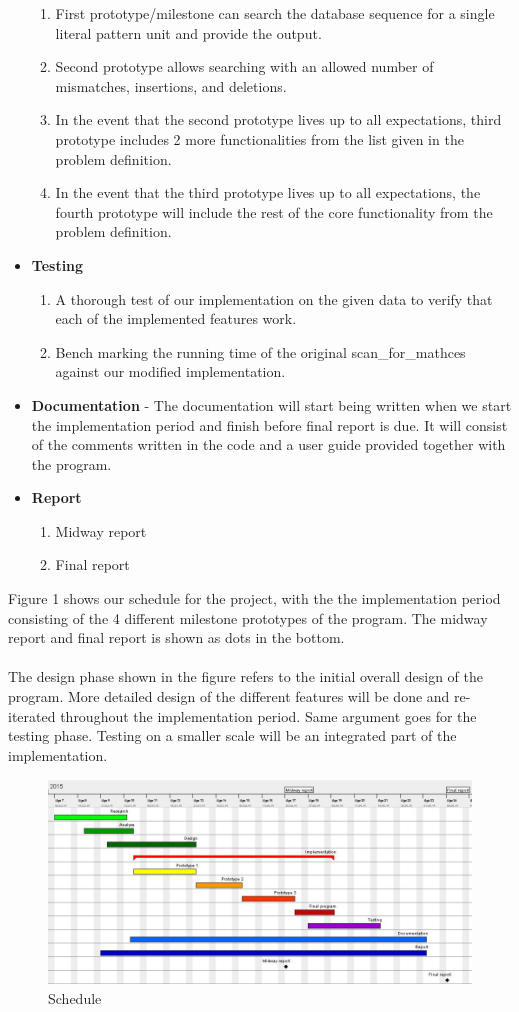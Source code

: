 \documentclass[12pt]{article}
\begin{document}
\begin{itemize}
\begin{enumerate}
\item First prototype/milestone can search the database sequence for a single literal pattern unit and provide the output.
\item Second prototype allows searching with an allowed number of mismatches, insertions, and deletions.
\item In the event that the second prototype lives up to all expectations, third prototype includes 2 more functionalities from the list given in the problem definition.
\item In the event that the third prototype lives up to all expectations, the fourth prototype will include the rest of the core functionality from the problem definition.
\end{enumerate}
\item \textbf{Testing}
\begin{enumerate}
\item A thorough test of our implementation on the given data to verify that each of the implemented features work.
\item Bench marking the running time of the original scan\_for\_mathces against our modified implementation.
\end{enumerate}
\item \textbf{Documentation} - The documentation will start being written when we start the implementation period
and finish before final report is due. It will consist of the comments written in the code and a user guide provided 
together with the program.
\item \textbf{Report}
\begin{enumerate}
\item Midway report
\item Final report
\end{enumerate}
\end{itemize}
Figure 1 shows our schedule for the project, with the the implementation period consisting of the 4 different milestone
prototypes of the program. The midway report and final report is shown as dots in the bottom. \\ \\
The design phase shown in the figure refers to the initial overall design of the program. 
More detailed design of the different features will be done and re-iterated throughout the implementation period. 
Same argument goes for the testing phase. Testing on a smaller scale will be an
integrated part of the implementation.
 \newpage
\begin{figure}[h!]
\includegraphics[scale=0.7]{gantt.PNG}
\caption{Schedule}
\end{figure}
\end{document}
